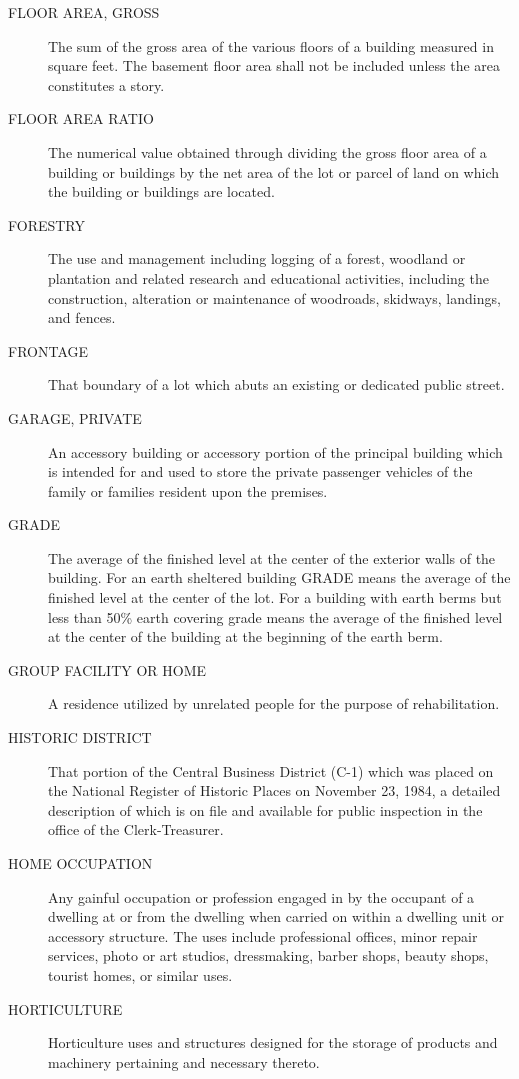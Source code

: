 \begin{description}
    \item[FLOOR AREA, GROSS]The sum of the gross area of the various floors of a building measured in square feet. The basement floor area shall not be included unless the area constitutes a story.
    \item[FLOOR AREA RATIO] The numerical value obtained through dividing the gross floor area of a building or buildings by the net area of the lot or parcel of land on which the building or buildings are located.
    \item[FORESTRY] The use and management including logging of a forest, woodland or plantation and related research and educational activities, including the construction, alteration or maintenance of woodroads, skidways, landings, and fences.
    \item[FRONTAGE] That boundary of a lot which abuts an existing or dedicated public street.
    \item[GARAGE, PRIVATE] An accessory building or accessory portion of the principal building which is intended for and used to store the private passenger vehicles of the family or families resident upon the premises.
    \item[GRADE] The average of the finished level at the center of the exterior walls of the building.  For an earth sheltered building GRADE means the average of the finished level at the center of the lot.  For a building with earth berms but less than 50\% earth covering grade means the average of the finished level at the center of the building at the beginning of the earth berm.
    \item[GROUP FACILITY OR HOME] A residence utilized by unrelated people for the purpose of rehabilitation.
    \item[HISTORIC DISTRICT] That portion of the Central Business District (C-1) which was placed on the National Register of Historic Places on November 23, 1984, a detailed description of which is on file and available for public inspection in the office of the Clerk-Treasurer.
    \item[HOME OCCUPATION] Any gainful occupation or profession engaged in by the occupant of a dwelling at or from the dwelling when carried on within a dwelling unit or accessory structure.  The uses include professional offices, minor repair services, photo or art studios, dressmaking, barber shops, beauty shops, tourist homes, or similar uses.
    \item[HORTICULTURE] Horticulture uses and structures designed for the storage of products and machinery pertaining and necessary thereto.

\end{description}
